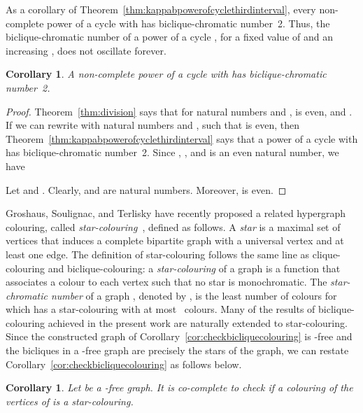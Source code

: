 \documentclass{article}
\newtheorem{corollary}[theorem]{Corollary}
\begin{document}
As a corollary of Theorem~\ref{thm:kappabpowerofcyclethirdinterval}, every non-complete
power of a cycle  with  has biclique-chromatic number~2.
Thus, the biclique-chromatic number of a power of a cycle , for a fixed
value of  and an increasing , does not oscillate forever.

\begin{corollary}
A non-complete power of a cycle  with  has biclique-chromatic
number~2. 
\end{corollary}
\begin{proof}
Theorem~\ref{thm:division} says that  for natural numbers
 and ,  is even, and . If we can rewrite  with natural numbers  and , such that  is
even, then Theorem~\ref{thm:kappabpowerofcyclethirdinterval} says that a power of a cycle
 with  has biclique-chromatic number~2. Since , , and  is an even natural number, we have 



Let  and . Clearly,  and  are natural numbers. 
Moreover,  is even.
\end{proof}

Groshaus, Soulignac, and Terlisky have recently proposed a related hypergraph
colouring, called \emph{star-colouring}~\cite{1210.7269}, defined as
follows. A \emph{star} is a maximal set of vertices that induces a
complete bipartite graph with a universal vertex and at least one edge. 
The definition of star-colouring follows the same line as clique-colouring and
biclique-colouring: a \emph{star-colouring} of a graph  is a function that
associates a colour to each vertex such that no star is monochromatic. The 
\emph{star-chromatic number} of a graph , denoted by , is the 
least number of colours  for which  has a star-colouring with at most~ 
colours. Many of the results of biclique-colouring
achieved in the present work are naturally extended to star-colouring. Since the
constructed graph of Corollary~\ref{cor:checkbicliquecolouring} is -free
and the bicliques in a -free graph are precisely the stars of the graph,
we can restate Corollary~\ref{cor:checkbicliquecolouring} as follows below.

\begin{corollary}
Let  be a -free graph. It is co-complete to
check if a colouring of the vertices of  is a star-colouring.
\end{corollary}
\end{document}
